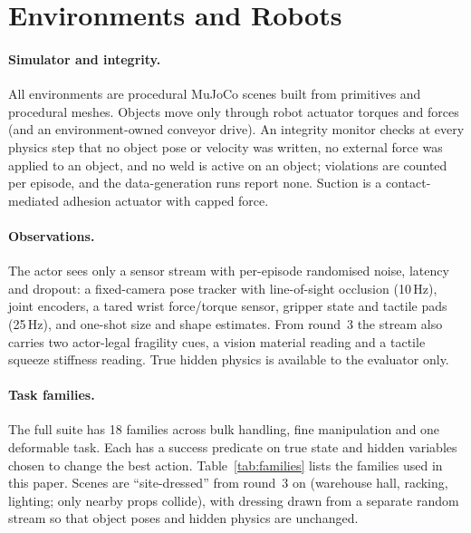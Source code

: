 \section{Environments and Robots}
\label{sec:envs}

\paragraph{Simulator and integrity.} All environments are procedural MuJoCo \citep{todorov2012mujoco} scenes
built from primitives and procedural meshes. Objects move only through robot actuator torques and forces (and
an environment-owned conveyor drive). An integrity monitor checks at every physics step that no object pose or
velocity was written, no external force was applied to an object, and no weld is active on an object;
violations are counted per episode, and the data-generation runs report none. Suction is a contact-mediated
adhesion actuator with capped force.

\paragraph{Observations.} The actor sees only a sensor stream with per-episode randomised noise, latency and
dropout: a fixed-camera pose tracker with line-of-sight occlusion (10\,Hz), joint encoders, a tared wrist
force/torque sensor, gripper state and tactile pads (25\,Hz), and one-shot size and shape estimates. From
round~3 the stream also carries two actor-legal fragility cues, a vision material reading and a tactile squeeze
stiffness reading. True hidden physics is available to the evaluator only.

\paragraph{Task families.} The full suite has 18 families across bulk handling, fine manipulation and one
deformable task. Each has a success predicate on true state and hidden variables chosen to change the best
action. Table~\ref{tab:families} lists the families used in this paper. Scenes are ``site-dressed'' from
round~3 on (warehouse hall, racking, lighting; only nearby props collide), with dressing drawn from a separate
random stream so that object poses and hidden physics are unchanged.

